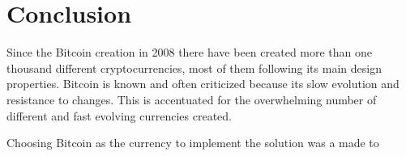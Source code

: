 \section{Conclusion}

Since the Bitcoin creation in 2008 there have been created more than one
  thousand different cryptocurrencies, most of them following its main design
  properties.
Bitcoin is known and often criticized because its slow evolution and resistance
  to changes.
This is accentuated for the overwhelming number of different and fast evolving
  currencies created.


Choosing Bitcoin as the currency to implement the solution was a made to
